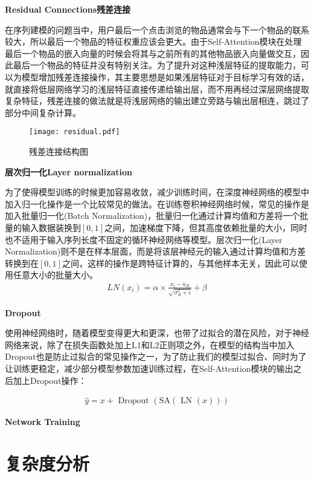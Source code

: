 \textbf{Residual Connections残差连接}

在序列建模的问题当中，用户最后一个点击浏览的物品通常会与下一个物品的联系较大，所以最后一个物品的特征权重应该会更大。由于Self-Attention模块在处理最后一个物品的嵌入向量的时候会将其与之前所有的其他物品嵌入向量做交互，因此最后一个物品的特征并没有特别关注。为了提升对这种浅层特征的提取能力，可以为模型增加残差连接操作，其主要思想是如果浅层特征对于目标学习有效的话，就直接将低层网络学习的浅层特征直接传递给输出层，而不用再经过深层网络提取复杂特征，残差连接的做法就是将浅层网络的输出建立旁路与输出层相连，跳过了部分中间复杂计算。

\begin{figure}
\centering
\texttt{[image: residual.pdf]}
\caption{残差连接结构图}
\label{residual}
\end{figure}

\textbf{层次归一化Layer normalization}

为了使得模型训练的时候更加容易收敛，减少训练时间，在深度神经网络的模型中加入归一化操作是一个比较常见的做法。在训练卷积神经网络时候，常见的操作是加入批量归一化(Batch Normalization)，批量归一化通过计算均值和方差将一个批量的输入数据装换到$[0,1]$之间，加速梯度下降，但其高度依赖批量的大小，同时也不适用于输入序列长度不固定的循环神经网络等模型。层次归一化(Layer Normalization)则不是在样本层面，而是将该层神经元的输入通过计算均值和方差转换到在$[0,1]$之间，这样的操作是跨特征计算的，与其他样本无关，因此可以使用任意大小的批量大小。
\begin{align}
	LN(x_i)=\alpha\times\frac{x_i-u_B}{\sqrt{\sigma_B^2+\epsilon}}+\beta
\end{align}

\textbf{Dropout}

使用神经网络时，随着模型变得更大和更深，也带了过拟合的潜在风险，对于神经网络来说，除了在损失函数处加上L1和L2正则项之外，在模型的结构当中加入Dropout也是防止过拟合的常见操作之一，为了防止我们的模型过拟合、同时为了让训练更稳定，减少部分模型参数加速训练过程，在Self-Attention模块的输出之后加上Dropout操作：

\begin{align}
	\hat{y}=x+\text { Dropout }(\text {SA}(\text { LN }(x)))
\end{align}

\textbf{Network Training}

\section{复杂度分析}


